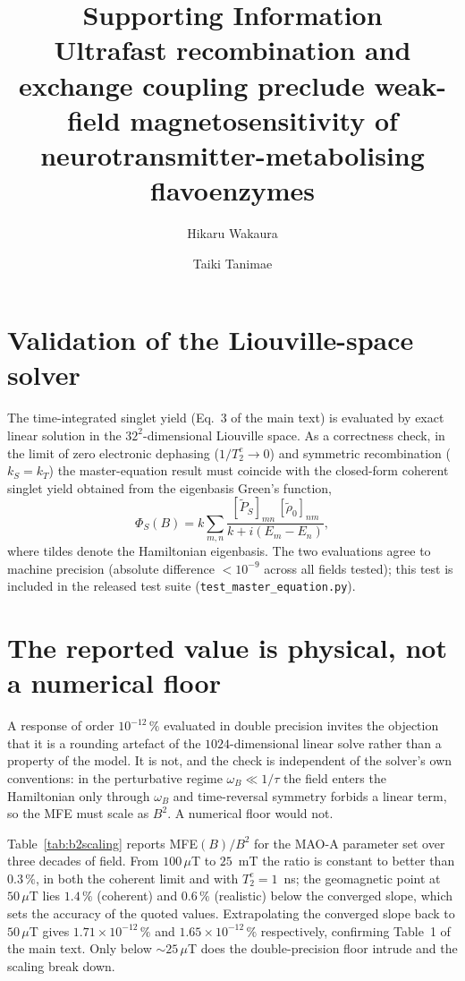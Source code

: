 \documentclass[11pt]{article}
\title{\textbf{Supporting Information}\\[0.4em]
Ultrafast recombination and exchange coupling preclude weak-field
magnetosensitivity of neurotransmitter-metabolising flavoenzymes}
\author{Hikaru Wakaura \and Taiki Tanimae}
\date{}
\begin{document}
\maketitle

\section{Validation of the Liouville-space solver}

The time-integrated singlet yield (Eq.~3 of the main text) is evaluated by exact
linear solution in the $32^2$-dimensional Liouville space. As a correctness
check, in the limit of zero electronic dephasing ($1/T_2^e \to 0$) and symmetric
recombination ($k_S = k_T$) the master-equation result must coincide with the
closed-form coherent singlet yield obtained from the eigenbasis Green's function,
\begin{equation}
\Phi_S(B) = k\sum_{m,n}
\frac{[\tilde P_S]_{mn}\,[\tilde\rho_0]_{nm}}{k + i(E_m - E_n)} ,
\end{equation}
where tildes denote the Hamiltonian eigenbasis. The two evaluations agree to
machine precision (absolute difference $<10^{-9}$ across all fields tested); this
test is included in the released test suite
(\texttt{test\_master\_equation.py}).

\section{The reported value is physical, not a numerical floor}
\label{sec:b2}

A response of order $10^{-12}\,\%$ evaluated in double precision invites the
objection that it is a rounding artefact of the $1024$-dimensional linear solve
rather than a property of the model. It is not, and the check is independent of
the solver's own conventions: in the perturbative regime $\omega_B \ll 1/\tau$
the field enters the Hamiltonian only through $\omega_B$ and time-reversal
symmetry forbids a linear term, so the MFE must scale as $B^2$. A numerical floor
would not.

Table~\ref{tab:b2scaling} reports MFE$(B)/B^2$ for the MAO-A parameter set over
three decades of field. From $100\,\mu$T to $25$~mT the ratio is constant to
better than $0.3\,\%$, in both the coherent limit and with $T_2^e = 1$~ns; the
geomagnetic point at $50\,\mu$T lies $1.4\,\%$ (coherent) and $0.6\,\%$
(realistic) below the converged slope, which sets the accuracy of the quoted
values. Extrapolating the converged slope back to $50\,\mu$T gives
$1.71\times10^{-12}\,\%$ and $1.65\times10^{-12}\,\%$ respectively, confirming
Table~1 of the main text. Only below $\sim\!25\,\mu$T does the double-precision
floor intrude and the scaling break down.
\end{document}
